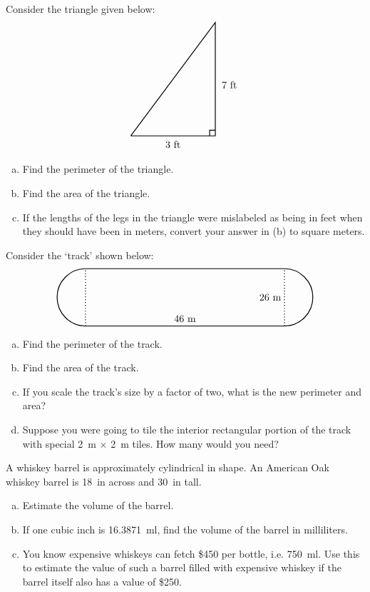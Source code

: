 \documentclass[11pt,letterpaper]{article}
\begin{document}

 Consider the triangle given below:
	\[
	\begin{tikzpicture}
	\draw[line width=0.03cm] (0,0) -- (3,0) -- (3,4) -- (0,0);
	\draw[line width=0.03cm] (2.8,0) -- (2.8,0.2) -- (3,0.2);
	\node at (1.5,-0.3) {$3$~ft};
	\node at (3.5,1.8) {$7$~ft};
	\end{tikzpicture}
	\]

\begin{enumerate}[(a)]
\item Find the perimeter of the triangle.
\item Find the area of the triangle. 
\item If the lengths of the legs in the triangle were mislabeled as being in feet when they should have been in meters, convert your answer in (b) to square meters. 
\end{enumerate}



\newpage



 Consider the `track' shown below:
	\[
	\begin{tikzpicture}
	\draw[line width=0.03cm] (0,0) -- (7,0);
	\draw[line width=0.03cm] (0,2) -- (7,2);
	
	\draw[line width=0.03cm,dotted] (0,0) -- (0,2);
	\draw[line width=0.03cm,dotted] (7,0) -- (7,2);
	 
	\draw[line width=0.03cm] (0,2) arc(90:270:1);
	\draw[line width=0.03cm] (7,0) arc(270:450:1);
	
	\node at (3.5,0.25) {$46$~m};
	\node at (6.5,1) {$26$~m};
	\end{tikzpicture}
	\]

\begin{enumerate}[(a)]
\item Find the perimeter of the track.
\item Find the area of the track.
\item If you scale the track's size by a factor of two, what is the new perimeter and area?
\item Suppose you were going to tile the interior rectangular portion of the track with special 2~m $\times$ 2~m tiles. How many would you need?
\end{enumerate}



\newpage



 A whiskey barrel is approximately cylindrical in shape. An American Oak whiskey barrel is 18~in across and 30~in tall.
	\begin{enumerate}[(a)]
	\item Estimate the volume of the barrel. 
	\item If one cubic inch is 16.3871~ml, find the volume of the barrel in milliliters. 
	\item You know expensive whiskeys can fetch \$450 per bottle, i.e. 750~ml. Use this to estimate the value of such a barrel filled with expensive whiskey if the barrel itself also has a value of \$250.
	\end{enumerate}
\end{document}
